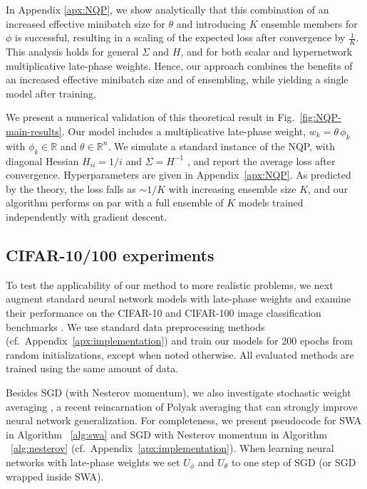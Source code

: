 \documentclass{article} \usepackage{iclr2021_conference,times}
\begin{document}
In Appendix \ref{apx:NQP}, we show analytically that this combination of an increased effective minibatch size for $\theta$ and introducing $K$ ensemble members for $\phi$ is successful, resulting in a scaling of the expected loss after convergence by $\frac{1}{K}$. This analysis holds for general $\Sigma$ and $H$, and for both scalar and hypernetwork multiplicative late-phase weights. Hence, our approach combines the benefits of an increased effective minibatch size and of ensembling, while yielding a single model after training.


We present a numerical validation of this theoretical result in Fig.~\ref{fig:NQP-main-results}. Our model includes a multiplicative late-phase weight, $w_k=\theta \, \phi_k $ with $\phi_k \in \mathbb{R}$ and $\theta \in \mathbb{R}^{n}$. We simulate a standard instance of the NQP, with diagonal Hessian $H_{ii}=1/i$ and $\Sigma=H^{-1}$ \citep[cf.][]{zhang_which_2019}, and report the average loss after convergence. Hyperparameters are given in Appendix~\ref{apx:NQP}. As predicted by the theory, the loss falls as $\sim 1/K$ with increasing ensemble size $K$, and our algorithm performs on par with a full ensemble of $K$ models trained independently with gradient descent.


\vspace{-0.15cm}
\subsection{CIFAR-10/100 experiments}
To test the applicability of our method to more realistic problems, we next augment standard neural network models with late-phase weights and examine their performance on the CIFAR-10 and CIFAR-100 image classification benchmarks \citep{krizhevsky_learning_2009}. We use standard data preprocessing methods (cf.~Appendix~\ref{apx:implementation}) and train our models for 200 epochs from random initializations, except when noted otherwise. All evaluated methods are trained using the same amount of data.

Besides SGD (with Nesterov momentum), we also investigate stochastic weight averaging \citep[SWA;][]{izmailov_averaging_2018}, a recent reincarnation of Polyak averaging \citep{polyak_acceleration_1992} that can strongly improve neural network generalization. For completeness, we present pseudocode for SWA in Algorithm ~\ref{alg:swa} and SGD with Nesterov momentum in Algorithm ~\ref{alg:nesterov} (cf.~Appendix~\ref{apx:implementation}). When learning neural networks with late-phase weights we set $U_\phi$ and $U_\theta$ to one step of SGD (or SGD wrapped inside SWA). 
\end{document}

